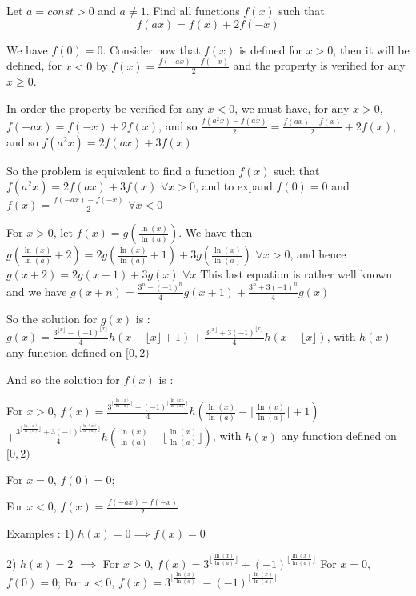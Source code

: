 \begin{mysolution}
	\begin{tcolorbox}Let $a=const >0$ and $a \neq 1$. Find all functions $f(x)$ such that
\[f(ax)=f(x)+2f(-x) \]
\end{tcolorbox}

We have $f(0)=0$. Consider now that $f(x)$ is defined for $x>0$, then it will be defined, for $x<0$ by $f(x)=\frac{f(-ax)-f(-x)}{2}$ and the property is verified for any $x\geq 0$.

In order the property be verified for any $x<0$, we must have, for any $x>0$, $f(-ax)=f(-x)+2f(x)$, and so $\frac{f(a^{2}x)-f(ax)}{2}=\frac{f(ax)-f(x)}{2}+2f(x)$, and so $f(a^{2}x)=2f(ax)+3f(x)$

So the problem is equivalent to find a function $f(x)$ such that $f(a^{2}x)=2f(ax)+3f(x)$ $\forall x>0$, and to expand $f(0)=0$ and $f(x)=\frac{f(-ax)-f(-x)}{2}$  $\forall x<0$

For $x>0$, let $f(x)=g(\frac{ \ln(x)}{\ln(a)})$. We have then $g(\frac{\ln(x)}{\ln(a)}+2)=2g(\frac{\ln(x)}{\ln(a)}+1)+3g(\frac{\ln(x)}{\ln(a)})$ $\forall x>0$, and hence $g(x+2)=2g(x+1)+3g(x)$ $\forall x$
This last equation is rather well known and we have $g(x+n)=\frac{3^{n}-(-1)^{n}}{4}g(x+1)+\frac{3^{n}+3(-1)^{n}}{4}g(x)$

So the solution for $g(x)$ is :
$g(x)=\frac{3^{\lfloor x\rfloor}-(-1)^{\lfloor x\rfloor}}{4}h(x-\lfloor x\rfloor+1)+\frac{3^{\lfloor x\rfloor}+3(-1)^{\lfloor x\rfloor}}{4}h(x-\lfloor x\rfloor)$, with $h(x)$ any function defined on $[0,2)$

And so the solution for $f(x)$ is :

For $x>0$, $f(x)=\frac{3^{\lfloor \frac{ \ln(x)}{\ln(a)}\rfloor}-(-1)^{\lfloor \frac{ \ln(x)}{\ln(a)}\rfloor}}{4}h(\frac{ \ln(x)}{\ln(a)}-\lfloor \frac{ \ln(x)}{\ln(a)}\rfloor+1)$ $+\frac{3^{\lfloor \frac{ \ln(x)}{\ln(a)}\rfloor}+3(-1)^{\lfloor \frac{ \ln(x)}{\ln(a)}\rfloor}}{4}h(\frac{ \ln(x)}{\ln(a)}-\lfloor \frac{ \ln(x)}{\ln(a)}\rfloor)$, with $h(x)$ any function defined on $[0,2)$

For $x=0$, $f(0)=0$;

For $x<0$, $f(x)=\frac{f(-ax)-f(-x)}{2}$


Examples :
1) $h(x)=0\implies f(x)=0$

2) $h(x)=2$ $\implies$
For $x>0$, $f(x)=3^{\lfloor \frac{ \ln(x)}{\ln(a)}\rfloor}+(-1)^{\lfloor \frac{ \ln(x)}{\ln(a)}\rfloor}$
For $x=0$, $f(0)=0$;
For $x<0$, $f(x)=3^{\lfloor \frac{ \ln(x)}{\ln(a)}\rfloor}-(-1)^{\lfloor \frac{ \ln(x)}{\ln(a)}\rfloor}$
\end{mysolution}



